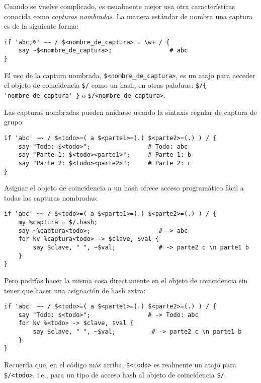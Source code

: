 Cuando se vuelve complicado, es usualmente mejor usa
otra características conocida como \emph{capturas nombradas}.
La manera estándar de nombra una captura es de la siguiente forma:

\begin{verbatim}
if 'abc;%' ~~ / $<nombre_de_captura> = \w+ / {
    say ~$<nombre_de_captura>;                # abc
}
\end{verbatim} 

El uso de la captura nombrada, \verb|$<nombre_de_captura>|,
es un atajo para acceder el objeto de coincidencia \verb|$/|
como un hash, en otras palabras: \verb|$/{ 'nombre_de_captura' }|
o \verb|$/<nombre_de_captura>|.

Las capturas nombradas pueden anidarse usando la sintaxis regular
de captura de grupo:

\begin{verbatim}
if 'abc' ~~ / $<todo>=( a $<parte1>=(.) $<parte2>=(.) ) / {
    say "Todo: $<todo>";                # Todo: abc
    say "Parte 1: $<todo><parte1>";     # Parte 1: b
    say "Parte 2: $<todo><parte2>";     # Parte 2: c
}
\end{verbatim} 

Asignar el objeto de coincidencia a un hash ofrece acceso programático 
fácil a todas las capturas nombradas:

\begin{verbatim}
if 'abc' ~~ / $<todo>=( a $<parte1>=(.) $<parte2>=(.) ) / {
    my %captura = $/.hash;    
    say ~%captura<todo>;                   # -> abc
    for kv %captura<todo> -> $clave, $val {
        say $clave, " ", ~$val;            # -> parte2 c \n parte1 b
    }
}
\end{verbatim} 

Pero podrías hacer la misma cosa directamente en el objeto de
coincidencia sin tener que hacer una asignación de hash extra:

\begin{verbatim}
if 'abc' ~~ / $<todo>=( a $<parte1>=(.) $<parte2>=(.) ) / {
    say "Todo: $<todo>";                # -> Todo: abc
    for kv %<todo> -> $clave, $val {
        say $clave, " ", ~$val;          # -> parte2 c \n parte1 b
    }
}
\end{verbatim}

Recuerda que, en el código más arriba, \verb|$<todo>| es
realmente un atajo para \verb|$/<todo>|, i.e., para un
tipo de acceso hash al objeto de coincidencia \verb|$/|.

